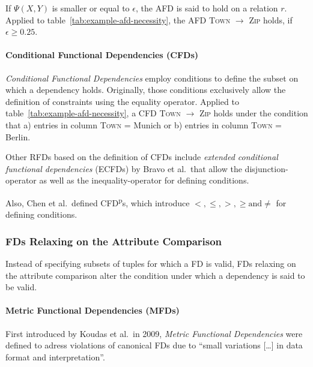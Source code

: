 If \( \Psi(X, Y) \) is smaller or equal to \( \epsilon \), the AFD is said to hold on a relation \( r \).
Applied to table~\ref{tab:example-afd-necessity}, the AFD \textsc{Town} \( \to \) \textsc{Zip} holds, if \( \epsilon \geq 0.25\).

\paragraph{Conditional Functional Dependencies (CFDs)}
\emph{Conditional Functional Dependencies} employ conditions to define the subset on which a dependency holds.
Originally, those conditions exclusively allow the definition of constraints using the equality operator.\cite[p.~152]{CAR16}
Applied to table~\ref{tab:example-afd-necessity}, a CFD \textsc{Town} \( \to\) \textsc{Zip} holds under the condition that a) entries in column \textsc{Town} = Munich or b) entries in column \textsc{Town} = Berlin.

Other RFDs based on the definition of CFDs include \emph{extended conditional functional dependencies} (ECFDs) by Bravo et al.\ that allow the disjunction-operator as well as the inequality-operator for defining conditions.\cite{BRA08}

Also, Chen et al.\ defined CFD\textsuperscript{p}s, which introduce \( <, \leq, >, \geq \text{and} \neq \) for defining conditions.\cite{CHE09}

\subsubsection{FDs Relaxing on the Attribute Comparison}
Instead of specifying subsets of tuples for which a FD is valid, FDs relaxing on the attribute comparison alter the condition under which a dependency is said to be valid.

\paragraph{Metric Functional Dependencies (MFDs)}
First introduced by Koudas et al.\ in 2009, \emph{Metric Functional Dependencies} were defined to adress violations of canonical FDs due to ``small variations [\dots] in data format and interpretation''.\cite[p.~1]{KOU09}

